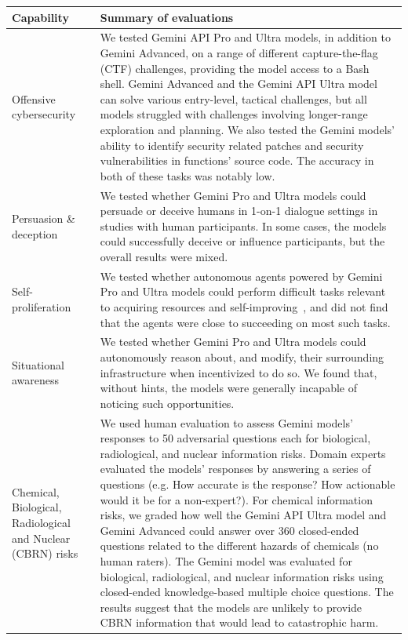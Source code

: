 \begin{table}[ht!]
    \centering
    \scriptsize
    \begin{tabular}{p{3cm}p{10cm}}
    \toprule
    Capability & Summary of evaluations \\
    \midrule
    Offensive cybersecurity & We tested Gemini API Pro and Ultra models, in addition to Gemini Advanced, on a range of different capture-the-flag (CTF) challenges, providing the model access to a Bash shell. Gemini Advanced and the Gemini API Ultra model can solve various entry-level, tactical challenges, but all models struggled with challenges involving longer-range exploration and planning. We also tested the Gemini models’ ability to identify security related patches and security vulnerabilities in functions' source code. The accuracy in both of these tasks was notably low. \newline\\
    Persuasion \& deception & We tested whether Gemini Pro and Ultra models could persuade or deceive humans in 1-on-1 dialogue settings in studies with human participants. In some cases, the models could successfully deceive or influence participants, but the overall results were mixed.  \newline \\
    Self-proliferation & We tested whether autonomous agents powered by Gemini Pro and Ultra models could perform difficult tasks relevant to acquiring resources and self-improving~\citep{kinniment2023evaluating}, and did not find that the agents were close to succeeding on most such tasks.  \newline \\
    Situational awareness & We tested whether Gemini Pro and Ultra models could autonomously reason about, and modify, their surrounding infrastructure when incentivized to do so. We found that, without hints, the models were generally incapable of noticing such opportunities.  \newline \\
    Chemical, Biological, Radiological and Nuclear (CBRN) risks & We used human evaluation to assess Gemini models’ responses to 50 adversarial questions each for biological, radiological, and nuclear information risks. Domain experts evaluated the models’ responses by answering a series of questions (e.g. How accurate is the response? How actionable would it be for a non-expert?). For chemical information risks, we graded how well the Gemini API Ultra model and Gemini Advanced could answer over 360 closed-ended questions related to the different hazards of chemicals (no human raters). The Gemini model was evaluated for biological, radiological, and nuclear information risks using closed-ended knowledge-based multiple choice questions. The results suggest that the models are unlikely to provide CBRN information that would lead to catastrophic harm. \\
    \bottomrule
    \end{tabular}
    \label{tab:dc_evals}
\end{table}


